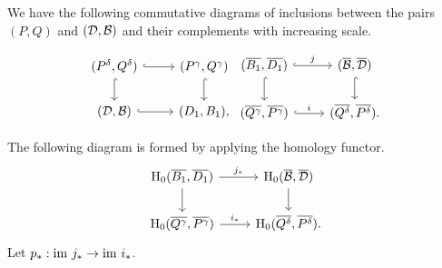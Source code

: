 
We have the following commutative diagrams of inclusions between the pairs $(P,Q)$ and $({\mathcal{D}}, {\mathcal{B}})$ and their complements with increasing scale.

\[ \begin{tikzcd}
  (P^\delta, Q^\delta) \arrow[hookrightarrow]{r}\arrow[hookrightarrow]{d} &
  (P^\gamma, Q^\gamma) \arrow[hookrightarrow]{d} \\
  (\D, \B) \arrow[hookrightarrow]{r} &
  (D_1, B_1),
\end{tikzcd}\begin{tikzcd}
  (\overline{B_1}, \overline{D_1})\arrow[hookrightarrow]{r}{j}\arrow[hookrightarrow]{d} &
  (\overline{\B}, \overline{\D}) \arrow[hookrightarrow]{d}\\
  (\overline{Q^\gamma}, \overline{P^\gamma}) \arrow[hookrightarrow]{r}{i} &
  (\overline{Q^\delta}, \overline{P^\delta}).
\end{tikzcd}\]

The following diagram is formed by applying the homology functor.
\begin{equation}\label{dgm:1}\begin{tikzcd}
    \hom_0(\overline{B_1}, \overline{D_1})\arrow{r}{j_*}\arrow{d} &
    \hom_0(\overline{\B}, \overline{\D}) \arrow{d} \\
    \hom_0(\overline{Q^\gamma}, \overline{P^\gamma}) \arrow{r}{i_*} &
    \hom_0(\overline{Q^\delta}, \overline{P^\delta}).
\end{tikzcd}\end{equation}
Let $p_* : \mathrm{im}~j_*\to\mathrm{im}~i_*$.

%

